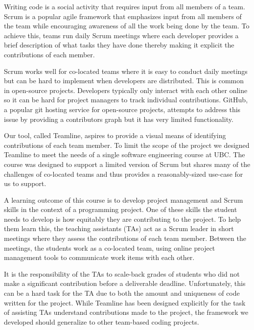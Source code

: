 \documentclass[../manifest.tex]{subfiles}
\begin{document}
Writing code is a social activity that requires input from all members of a team. Scrum is a popular agile framework that emphasizes input from all members of the team while encouraging awareness of all the work being done by the team. To achieve this, teams run daily Scrum meetings where each developer provides a brief description of what tasks they have done thereby making it explicit the contributions of each member.

Scrum works well for co-located teams where it is easy to conduct daily meetings but can be hard to implement when developers are distributed. This is common in open-source projects. Developers typically only interact with each other online so it can be hard for project managers to track individual contributions. GitHub, a popular git hosting service for open-source projects, attempts to address this issue by providing a contributors graph but it has very limited functionality.

Our tool, called Teamline, aspires to provide a visual means of identifying contributions of each team member. To limit the scope of the project we designed Teamline to meet the needs of a single software engineering course at UBC. The course was designed to support a limited version of Scrum but shares many of the challenges of co-located teams and thus provides a reasonably-sized use-case for us to support.



A learning outcome of this course is to develop project management and Scrum skills in the context of a programming project. One of these skills the student needs to develop is how equitably they are contributing to the project. To help them learn this, the teaching assistants (TAs) act as a Scrum leader in short meetings where they assess the contributions of each team member. Between the meetings, the students work as a co-located team, using online project management tools to communicate work items with each other.

It is the responsibility of the TAs to scale-back grades of students who did not make a significant contribution before a deliverable deadline. Unfortunately, this can be a hard task for the TA due to both the amount and uniqueness of code written for the project. While Teamline has been designed explicitly for the task of assisting TAs understand contributions made to the project, the framework we developed should generalize to other team-based coding projects.
\end{document}
